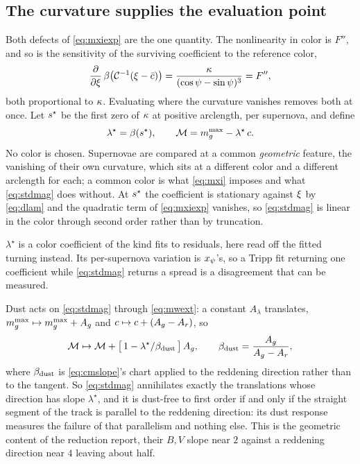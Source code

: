 \documentclass[11pt]{article}
\theoremstyle{plain}
\begin{document}
\subsection{The curvature supplies the evaluation point}
\label{sec:stdmag}

Both defects of \eqref{eq:mxiexp} are the one quantity. The nonlinearity in color is
$F''$, and so is the sensitivity of the surviving coefficient to the reference color,
\begin{equation}
  \frac{\partial }{\partial \xi}\,\beta\bigl(\mathcal{C}^{-1}(\xi - \bar{c})\bigr)
    = \frac{\kappa}{(\cos\psi - \sin\psi)^{3}} = F'' ,
  \label{eq:dlam}
\end{equation}
both proportional to $\kappa$. Evaluating where the curvature vanishes removes both at
once. Let $s^{\star}$ be the first zero of $\kappa$ at positive arclength, per
supernova, and define
\begin{equation}
  \lambda^{\star} = \beta(s^{\star}) , \qquad
  \mathcal{M} = m_{g}^{\max} - \lambda^{\star}\,c .
  \label{eq:stdmag}
\end{equation}
No color is chosen. Supernovae are compared at a common \emph{geometric} feature, the
vanishing of their own curvature, which sits at a different color and a different
arclength for each; a common color is what \eqref{eq:mxi} imposes and what
\eqref{eq:stdmag} does without. At $s^{\star}$ the coefficient is stationary against
$\xi$ by \eqref{eq:dlam} and the quadratic term of \eqref{eq:mxiexp} vanishes, so
\eqref{eq:stdmag} is linear in the color through second order rather than by truncation.

$\lambda^{\star}$ is a color coefficient of the kind \citet{Tripp1998} fits to residuals,
here read off the fitted turning instead. Its per-supernova variation is $x_{\psi}$'s, so
a Tripp fit returning one coefficient while \eqref{eq:stdmag} returns a spread is a
disagreement that can be measured.

Dust acts on \eqref{eq:stdmag} through \eqref{eq:mwext}: a constant $A_{\lambda}$
translates, $m_{g}^{\max} \mapsto m_{g}^{\max} + A_{g}$ and
$c \mapsto c + (A_{g} - A_{r})$, so
\begin{equation}
  \mathcal{M} \mapsto \mathcal{M}
    + \bigl[\,1 - \lambda^{\star}/\beta_{\mathrm{dust}}\,\bigr]\,A_{g} ,
  \qquad
  \beta_{\mathrm{dust}} = \frac{A_{g}}{A_{g} - A_{r}} ,
  \label{eq:dustresp}
\end{equation}
where $\beta_{\mathrm{dust}}$ is \eqref{eq:cmslope}'s chart applied to the reddening
direction rather than to the tangent. So \eqref{eq:stdmag} annihilates exactly the
translations whose direction has slope $\lambda^{\star}$, and it is dust-free to first
order if and only if the straight segment of the track is parallel to the reddening
direction: its dust response measures the failure of that parallelism and nothing else.
This is the geometric content of the reduction \citet{Wang2003} report, their $B,V$ slope
near $2$ against a reddening direction near $4$ leaving about half.
\end{document}
